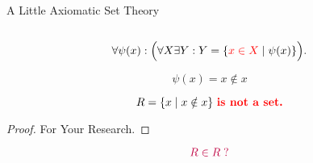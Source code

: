 \begin{frame}{}
  \centerline{\Large A Little Axiomatic Set Theory }

  \vspace{0.80cm}
  \begin{columns}
  \end{columns}
\end{frame}



\begin{frame}{}
  \begin{definition}
    \[
      \forall \psi(x): \Big(\forall X \exists Y: Y = \{\textcolor{red}{x \in X} \mid \psi(x)\}\Big).
    \]
  \end{definition}
\end{frame}

\begin{frame}{}
  \[
    \psi(x) = x \notin x
  \]

  \pause
  \begin{theorem}
    \[
      R = \{x \mid x \notin x\} \textcolor{red}{\text{\bf \;is not a set.}}
    \]
  \end{theorem}

  \pause
  \begin{proof}
    \centerline{\large For Your Research.}
    \vspace{0.50cm}
    \vspace{-0.50cm}
  \end{proof}

  \pause
  \[
    \textcolor{purple}{R \in R \;?}
  \]
\end{frame}

